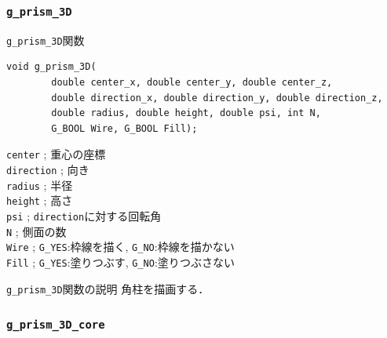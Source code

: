 \documentclass[platex,a4paper,12pt]{jsarticle}%
\begin{document}
\clearpage
\subsubsection{\texttt{g\_prism\_3D}}

\begin{itembox}[l]{\texttt{g\_prism\_3D}関数}
\begin{verbatim}
void g_prism_3D(
        double center_x, double center_y, double center_z,
        double direction_x, double direction_y, double direction_z,
        double radius, double height, double psi, int N,
        G_BOOL Wire, G_BOOL Fill);   
\end{verbatim}
\verb|center| ; 重心の座標\\
\verb|direction| ; 向き\\
\verb|radius| ; 半径\\
\verb|height| ; 高さ\\
\verb|psi| ; \verb|direction|に対する回転角\\
\verb|N| ; 側面の数\\
\verb|Wire| ; \verb|G_YES|:枠線を描く, \verb|G_NO|:枠線を描かない \\
\verb|Fill| ; \verb|G_YES|:塗りつぶす, \verb|G_NO|:塗りつぶさない
\end{itembox}

\begin{itembox}[l]{\texttt{g\_prism\_3D}関数の説明}
角柱を描画する．
\end{itembox}





\clearpage
\subsubsection{\texttt{g\_prism\_3D\_core}}
\end{document}
